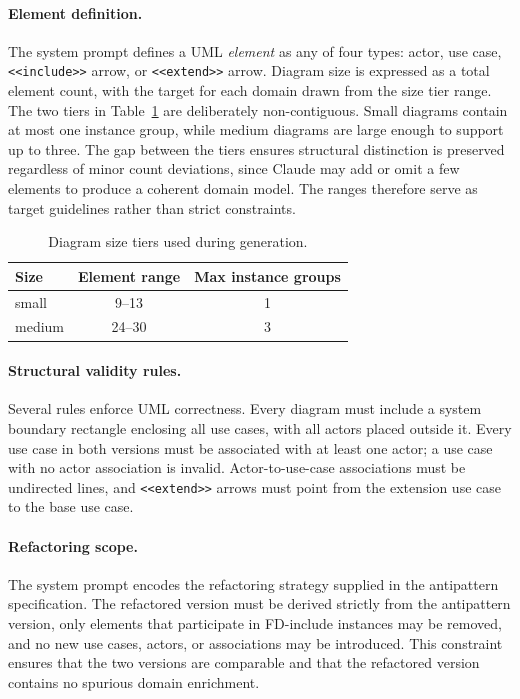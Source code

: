 \documentclass[sigconf,review,anonymous]{acmart}
\begin{document}
\paragraph{Element definition.}
The system prompt defines a UML \emph{element} as any of four types: actor,
use case, \texttt{<<include>>} arrow, or \texttt{<<extend>>} arrow.  Diagram size is expressed as a total element count,
with the target for each domain drawn from the size tier range.  The two
tiers in Table~\ref{tab:size} are deliberately non-contiguous. Small
diagrams contain at most one instance group,
while medium diagrams are large enough to support up to three.  The gap
between the tiers ensures structural distinction is preserved regardless
of minor count deviations, since Claude may add or omit a few elements to
produce a coherent domain model.  The ranges therefore serve as target
guidelines rather than strict constraints.

\begin{table}[h]
\centering
\caption{Diagram size tiers used during generation.}
\label{tab:size}
\begin{tabular}{lcc}
\toprule
\textbf{Size} & \textbf{Element range} & \textbf{Max instance groups} \\
\midrule
small  & 9–13  & 1 \\
medium & 24–30 & 3 \\
\bottomrule
\end{tabular}
\end{table}

\paragraph{Structural validity rules.}
Several rules enforce UML correctness.
Every diagram must include a system boundary rectangle enclosing all use
cases, with all actors placed outside it.
Every use case in both versions must be associated with at least one
actor; a use case with no actor association is invalid.
Actor-to-use-case associations must be undirected lines, and
\texttt{<<extend>>} arrows must point from the extension use case to the
base use case.

\paragraph{Refactoring scope.}
The system prompt encodes the refactoring strategy supplied in the
antipattern specification.  The refactored
version must be derived strictly from the antipattern version, only
elements that participate in FD-include instances may be removed, and no
new use cases, actors, or associations may be introduced.  This constraint
ensures that the two versions are comparable and that the refactored
version contains no spurious domain enrichment.
\end{document}
